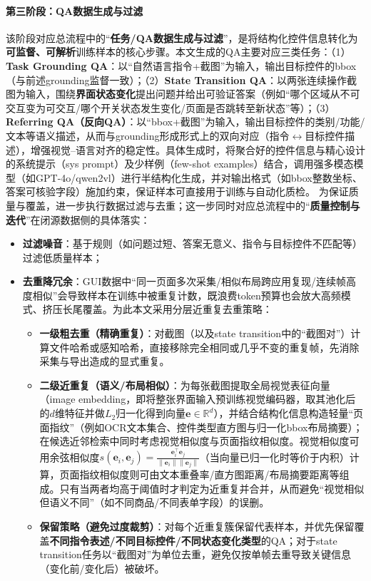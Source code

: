 \paragraph{第三阶段：QA数据生成与过滤}
该阶段对应总流程中的“\textbf{任务/QA数据生成与过滤}”，是将结构化控件信息转化为\textbf{可监督、可解析}训练样本的核心步骤。本文生成的QA主要对应三类任务：（1）\textbf{Task Grounding QA}：以“自然语言指令+截图”为输入，输出目标控件的bbox（与前述grounding监督一致）；（2）\textbf{State Transition QA}：以两张连续操作截图为输入，围绕\textbf{界面状态变化}提出问题并给出可验证答案（例如“哪个区域从不可交互变为可交互/哪个开关状态发生变化/页面是否跳转至新状态”等）；（3）\textbf{Referring QA（反向QA）}：以“bbox+截图”为输入，输出目标控件的类别/功能/文本等语义描述，从而与grounding形成形式上的双向对应（指令$\leftrightarrow$目标控件描述），增强视觉--语言对齐的稳定性。具体生成时，将聚合好的控件信息与精心设计的系统提示（sys prompt）及少样例（few-shot examples）结合，调用强多模态模型（如GPT-4o/qwen2vl）进行半结构化生成\citep{openai2024gpt4o,bai2025qwen25vl}，并对输出格式（如bbox整数坐标、答案可核验字段）施加约束，保证样本可直接用于训练与自动化质检。
为保证质量与覆盖，进一步执行数据过滤与去重；这一步同时对应总流程中的“\textbf{质量控制与迭代}”在闭源数据侧的具体落实：
\begin{itemize}
  \item \textbf{过滤噪音}：基于规则（如问题过短、答案无意义、指令与目标控件不匹配等）过滤低质量样本；
  \item \textbf{去重降冗余}：GUI数据中“同一页面多次采集/相似布局跨应用复现/连续帧高度相似”会导致样本在训练中被重复计数，既浪费token预算也会放大高频模式、挤压长尾覆盖。为此本文采用分层近重复去重策略：
  \begin{itemize}
    \item \textbf{一级粗去重（精确重复）}：对截图（以及state transition中的“截图对”）计算文件哈希或感知哈希，直接移除完全相同或几乎不变的重复帧，先消除采集与导出造成的显式重复。
    \item \textbf{二级近重复（语义/布局相似）}：为每张截图提取全局视觉表征向量（image embedding，即将整张界面输入预训练视觉编码器，取其池化后的$d$维特征并做$L_2$归一化得到向量$\mathbf{e}\in\mathbb{R}^d$），并结合结构化信息构造轻量“页面指纹”（例如OCR文本集合、控件类型直方图与归一化bbox布局摘要）；在候选近邻检索中同时考虑视觉相似度与页面指纹相似度。视觉相似度可用余弦相似度$s(\mathbf{e}_i,\mathbf{e}_j)=\frac{\mathbf{e}_i^\top\mathbf{e}_j}{\|\mathbf{e}_i\|\|\mathbf{e}_j\|}$（当向量已归一化时等价于内积）计算，页面指纹相似度则可由文本重叠率/直方图距离/布局摘要距离等组成。只有当两者均高于阈值时才判定为近重复并合并，从而避免“视觉相似但语义不同”（如不同商品/不同表单字段）的误删。
    \item \textbf{保留策略（避免过度裁剪）}：对每个近重复簇保留代表样本，并优先保留覆盖\textbf{不同指令表述/不同目标控件/不同状态变化类型}的QA；对于state transition任务以“截图对”为单位去重，避免仅按单帧去重导致关键信息（变化前/变化后）被破坏。
  \end{itemize}
\end{itemize}

